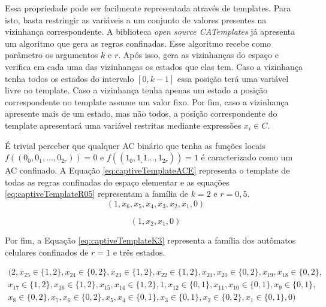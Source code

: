 \documentclass[12pt,a4paper]{article}
\begin{document}
	Essa propriedade pode ser facilmente representada através de templates. Para isto, basta restringir as variáveis a um conjunto de valores presentes na vizinhança correspondente. A biblioteca \textit{open source CATemplates} já apresenta um algoritmo que gera as regras confinadas. Esse algoritmo recebe como parâmetro os argumentos $k$ e $r$. Após isso, gera as vizinhanças do espaço e verifica em cada uma das vizinhanças os estados que elas tem. Caso a vizinhança tenha todos os estados do intervalo $[0, k-1]$ essa posição terá uma variável livre no template. Caso a vizinhança tenha apenas um estado a posição correspondente no template assume um valor fixo. Por fim, caso a vizinhança apresente mais de um estado, mas não todos, a posição correspondente do template apresentará uma variável restritas mediante expressões $x_i \in C$.

	É trivial perceber que qualquer AC binário que tenha as funções locais $f((0_0, 0_1,\dots, 0_{2r})) = 0$ e $f((1_0, 1_,1\dots, 1_{2r})) = 1$ é caracterizado como um AC confinado. A Equação \ref{eq:captiveTemplateACE} representa o template de todas as regras confinadas do espaço elementar e as equações \ref{eq:captiveTemplateR05} representam a família de $k=2$ e $r=0,5$.
	\begin{equation}
	(1,x_6,x_5,x_4,x_3,x_2,x_1,0)
	\label{eq:captiveTemplateACE}
	\end{equation}

	\begin{equation}
	(1,x_2,x_1,0)
	\label{eq:captiveTemplateR05}
	\end{equation}

	Por fim, a Equação \ref{eq:captiveTemplateK3} representa a família dos autômatos celulares confinados de $r=1$ e três estados.

	\begin{equation}
	\begin{split}
	(2, x_{25} \in \{1,2\}, x_{24} \in \{0,2\}, x_{23} \in \{1,2\}, x_{22} \in \{1,2\}, x_{21}, x_{20} \in \{0,2\}, x_{19}, x_{18} \in \{0,2\}, \\
	x_{17} \in \{1,2\}, x_{16} \in \{1,2\}, x_{15}, x_{14} \in \{1,2\},1, x_{12} \in \{0,1\}, x_{11}, x_{10} \in \{0,1\}, x_9 \in \{0,1\}, \\
	x_8 \in \{0,2\}, x_7, x_6 \in \{0,2\}, x_5, x_4 \in \{0,1\}, x_3 \in \{0,1\}, x_2 \in \{0,2\}, x_1 \in \{0,1\}, 0)
	\label{eq:captiveTemplateK3}
	\end{split}
	\end{equation}
\end{document}

